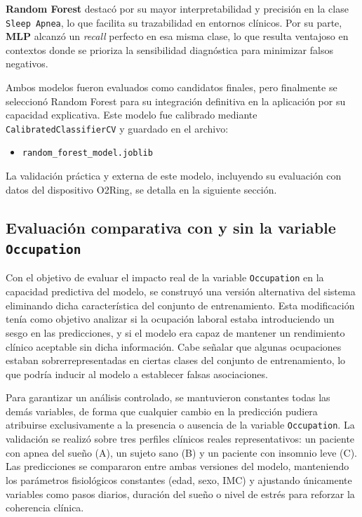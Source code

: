 \textbf{Random Forest} destacó por su mayor interpretabilidad y precisión en la clase \texttt{Sleep Apnea}, lo que facilita su trazabilidad en entornos clínicos. Por su parte, \textbf{MLP} alcanzó un \textit{recall} perfecto en esa misma clase, lo que resulta ventajoso en contextos donde se prioriza la sensibilidad diagnóstica para minimizar falsos negativos.


Ambos modelos fueron evaluados como candidatos finales, pero finalmente se seleccionó Random Forest para su integración definitiva en la aplicación por su capacidad explicativa. Este modelo fue calibrado mediante \texttt{CalibratedClassifierCV} y guardado en el archivo:

\begin{itemize}
  \item \texttt{random\_forest\_model.joblib}
\end{itemize}

La validación práctica y externa de este modelo, incluyendo su evaluación con datos del dispositivo O2Ring, se detalla en la siguiente sección.


\subsection{Evaluación comparativa con y sin la variable \texttt{Occupation}}

Con el objetivo de evaluar el impacto real de la variable \texttt{Occupation} en la capacidad predictiva del modelo, se construyó una versión alternativa del sistema eliminando dicha característica del conjunto de entrenamiento. Esta modificación tenía como objetivo analizar si la ocupación laboral estaba introduciendo un sesgo en las predicciones, y si el modelo era capaz de mantener un rendimiento clínico aceptable sin dicha información. Cabe señalar que algunas ocupaciones estaban sobrerrepresentadas en ciertas clases del conjunto de entrenamiento, lo que podría inducir al modelo a establecer falsas asociaciones.

Para garantizar un análisis controlado, se mantuvieron constantes todas las demás variables, de forma que cualquier cambio en la predicción pudiera atribuirse exclusivamente a la presencia o ausencia de la variable \texttt{Occupation}. La validación se realizó sobre tres perfiles clínicos reales representativos: un paciente con apnea del sueño (A), un sujeto sano (B) y un paciente con insomnio leve (C). Las predicciones se compararon entre ambas versiones del modelo, manteniendo los parámetros fisiológicos constantes (edad, sexo, IMC) y ajustando únicamente variables como pasos diarios, duración del sueño o nivel de estrés para reforzar la coherencia clínica.

